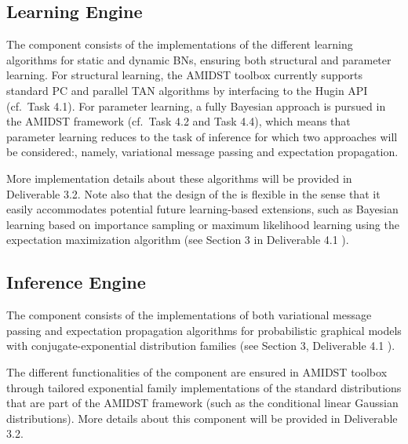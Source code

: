 \subsection{Learning Engine}

The  component consists of the implementations of the different learning algorithms for static and dynamic BNs, ensuring both structural and parameter learning. For structural learning, the AMIDST toolbox currently supports standard PC and parallel TAN algorithms by interfacing to the Hugin API (cf.\ Task 4.1). For parameter learning, a fully Bayesian approach is pursued in the AMIDST framework (cf.\ Task 4.2 and Task 4.4), which means that parameter learning reduces to the task of inference for which two approaches will be considered:, namely, variational message passing and expectation propagation. 

More implementation details about these algorithms will be provided in Deliverable 3.2. Note also that the design of the  is flexible in the sense that it easily accommodates potential future learning-based extensions, such as Bayesian learning based on importance sampling or maximum likelihood learning using the expectation maximization algorithm (see Section 3 in Deliverable 4.1 \cite{Deliverable4.1}). 
 
\subsection{Inference Engine}

The  component consists of the implementations of both variational message passing and expectation propagation algorithms 
for probabilistic graphical models with conjugate-exponential distribution families (see Section 3, Deliverable 4.1 \cite{Deliverable4.1}). 

The different functionalities of the  component are ensured in AMIDST toolbox through tailored exponential family implementations of the standard distributions that are part of the AMIDST framework (such as the conditional linear Gaussian distributions). More details about this component will be provided in Deliverable 3.2.  